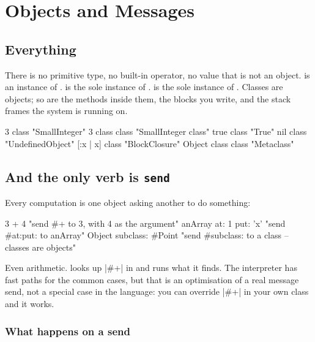 \chapter{Objects and Messages}
\label{ch:objects}


\section{Everything}

There is no primitive type, no built-in operator, no value that is not an
object.  is an instance of .  is the sole
instance of .  is the sole instance of .
Classes are objects; so are the methods inside them, the blocks you write, and
the stack frames the system is running on.

\begin{st}
3 class                  "SmallInteger"
3 class class            "SmallInteger class"
true class               "True"
nil class                "UndefinedObject"
[:x | x] class           "BlockClosure"
Object class class       "Metaclass"
\end{st}

\section{And the only verb is \texttt{send}}

Every computation is one object asking another to do something:

\begin{st}
3 + 4                    "send #+ to 3, with 4 as the argument"
anArray at: 1 put: 'x'   "send #at:put: to anArray"
Object subclass: #Point  "send #subclass: to a class -- classes are objects"
\end{st}

Even arithmetic.  looks up \ct|#+| in  and runs
what it finds. The interpreter has fast paths for the common cases, but that
is an optimisation of a real message send, not a special case in the language:
you can override \ct|#+| in your own class and it works.

\subsection{What happens on a send}

